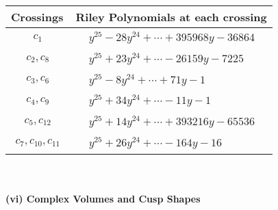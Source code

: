 \documentclass[1p]{elsarticle_modified}
\theoremstyle{definition}
\begin{document}
\begin{tabular}{m{50pt}|m{274pt}}
Crossings & \hspace{64pt}Riley Polynomials at each crossing \\
\hline $$\begin{aligned}c_{1}\end{aligned}$$&$\begin{aligned}
&y^{25}-28 y^{24}+\cdots+395968 y-36864
\end{aligned}$\\
\hline $$\begin{aligned}c_{2},c_{8}\end{aligned}$$&$\begin{aligned}
&y^{25}+23 y^{24}+\cdots-26159 y-7225
\end{aligned}$\\
\hline $$\begin{aligned}c_{3},c_{6}\end{aligned}$$&$\begin{aligned}
&y^{25}-8 y^{24}+\cdots+71 y-1
\end{aligned}$\\
\hline $$\begin{aligned}c_{4},c_{9}\end{aligned}$$&$\begin{aligned}
&y^{25}+34 y^{24}+\cdots-11 y-1
\end{aligned}$\\
\hline $$\begin{aligned}c_{5},c_{12}\end{aligned}$$&$\begin{aligned}
&y^{25}+14 y^{24}+\cdots+393216 y-65536
\end{aligned}$\\
\hline $$\begin{aligned}c_{7},c_{10},c_{11}\end{aligned}$$&$\begin{aligned}
&y^{25}+26 y^{24}+\cdots-164 y-16
\end{aligned}$\\
\hline
\end{tabular}\\~\\
\newpage\flushleft \textbf{(vi) Complex Volumes and Cusp Shapes}
\end{document}
